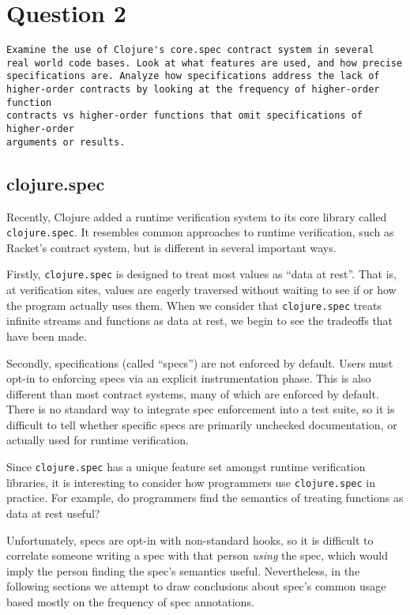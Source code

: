 \section{Question 2}

\begin{verbatim}
Examine the use of Clojure's core.spec contract system in several
real world code bases. Look at what features are used, and how precise
specifications are. Analyze how specifications address the lack of
higher-order contracts by looking at the frequency of higher-order function
contracts vs higher-order functions that omit specifications of higher-order
arguments or results.
\end{verbatim}

\subsection{clojure.spec}

Recently, Clojure added a runtime verification system to its core library called
\texttt{clojure.spec}.
It resembles common approaches to runtime verification, such as Racket's contract
system, but is different in several important ways.

Firstly, \texttt{clojure.spec} is designed to treat most values as ``data at rest''. That is,
at verification sites, values are eagerly traversed without waiting to see
if or how the program actually uses them.
When we consider that \texttt{clojure.spec} treats infinite streams
and functions as data at rest, we begin to see the tradeoffs that have been
made.

Secondly, specifications (called ``specs'') are not enforced by default. Users must
opt-in to enforcing specs via an explicit instrumentation phase.
This is also different than most contract systems, many of which are enforced
by default. There is no standard way to integrate spec enforcement into a
test suite, so it is difficult to tell whether specific specs are primarily 
unchecked documentation, or actually used for runtime verification.

Since \texttt{clojure.spec} has a unique feature set amongst runtime verification
libraries, it is interesting to consider how programmers use \texttt{clojure.spec}
in practice. For example, do programmers find the semantics of treating functions
as data at rest useful?

Unfortunately, specs are opt-in with non-standard hooks, so it is difficult to
correlate someone writing a spec with that person \emph{using} the spec, which
would imply the person finding the spec's semantics useful.
Nevertheless, in the following sections we attempt to draw conclusions about
spec's common usage based mostly on the frequency of spec annotations.

